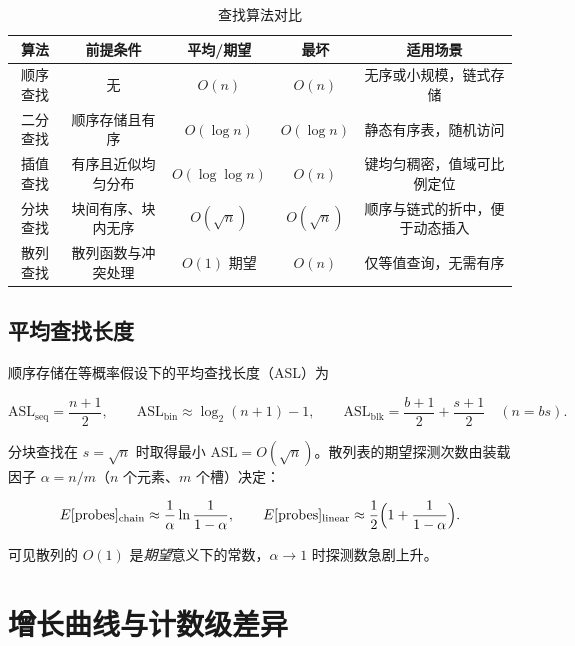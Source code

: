 \begin{table}[H]
\centering
\footnotesize
\renewcommand{\arraystretch}{1.35}
\begin{tabulary}{\textwidth}{@{}CCCCC@{}}
\toprule
\textbf{算法} & \textbf{前提条件} & \textbf{平均/期望} & \textbf{最坏} & \textbf{适用场景} \\
\midrule
顺序查找 & 无 & $O(n)$ & $O(n)$ & 无序或小规模，链式存储 \\
二分查找 & 顺序存储且有序 & $O(\log n)$ & $O(\log n)$ & 静态有序表，随机访问 \\
插值查找 & 有序且近似均匀分布 & $O(\log\log n)$ & $O(n)$ & 键均匀稠密，值域可比例定位 \\
分块查找 & 块间有序、块内无序 & $O(\sqrt n)$ & $O(\sqrt n)$ & 顺序与链式的折中，便于动态插入 \\
散列查找 & 散列函数与冲突处理 & $O(1)$ 期望 & $O(n)$ & 仅等值查询，无需有序 \\
\bottomrule
\end{tabulary}
\caption{查找算法对比}
\label{tab:search_master}
\end{table}

\subsection{平均查找长度}

顺序存储在等概率假设下的平均查找长度（ASL）为

\begin{equation}
\mathrm{ASL}_{\mathrm{seq}}=\frac{n+1}{2},\qquad
\mathrm{ASL}_{\mathrm{bin}}\approx\log_2(n+1)-1,\qquad
\mathrm{ASL}_{\mathrm{blk}}=\frac{b+1}{2}+\frac{s+1}{2}\quad(n=bs).
\label{eq:asl}
\end{equation}

分块查找在 $s=\sqrt n$ 时取得最小 $\mathrm{ASL}=O(\sqrt n)$。散列表的期望探测次数由装载
因子 $\alpha=n/m$（$n$ 个元素、$m$ 个槽）决定：

\begin{equation}
E[\mathrm{probes}]_{\mathrm{chain}}\approx\frac{1}{\alpha}\ln\frac{1}{1-\alpha},\qquad
E[\mathrm{probes}]_{\mathrm{linear}}\approx\frac{1}{2}\Bigl(1+\frac{1}{1-\alpha}\Bigr).
\label{eq:hash_probe}
\end{equation}

可见散列的 $O(1)$ 是\emph{期望}意义下的常数，$\alpha\to1$ 时探测数急剧上升。

\section{增长曲线与计数级差异}

